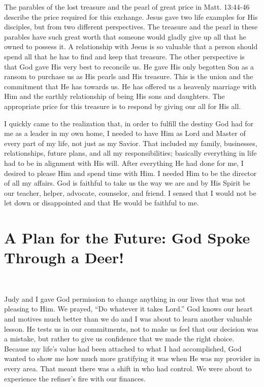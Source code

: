 \documentclass[twoside, 12pt]{book}
\begin{document}
The parables of the lost treasure and the pearl of great price in Matt. 13:44-46 describe the price required for this exchange. Jesus gave two life examples for His disciples, but from two different perspectives. The treasure and the pearl in these parables have such great worth that someone would gladly give up all that he owned to possess it. A relationship with Jesus is so valuable that a person should spend all that he has to find and keep that treasure. The other perspective is that God gave His very best to reconcile us. He gave His only begotten Son as a ransom to purchase us as His pearls and His treasure. This is the union and the commitment that He has towards us. He has offered us a heavenly marriage with Him and the earthly relationship of being His sons and daughters. The appropriate price for this treasure is to respond by giving our all for His all.

I quickly came to the realization that, in order to fulfill the destiny God had for me as a leader in my own home, I needed to have Him as Lord and Master of every part of my life, not just as my Savior. That included my family, businesses, relationships, future plans, and all my responsibilities; basically everything in life had to be in alignment with His will. After everything He had done for me, I desired to please Him and spend time with Him. I needed Him to be the director of all my affairs. God is faithful to take us the way we are and by His Spirit be our teacher, helper, advocate, counselor, and friend. I sensed that I would not be let down or disappointed and that He would be faithful to me.


\chapter{A Plan for the Future: God Spoke Through a Deer!}
\

Judy and I gave God permission to change anything in our lives that was not pleasing to Him. We prayed, “Do whatever it takes Lord.” God knows our heart and motives much better than we do and I was about to learn another valuable lesson. He tests us in our commitments, not to make us feel that our decision was a mistake, but rather to give us confidence that we made the right choice. Because my life’s value had been attached to what I had accomplished, God wanted to show me how much more gratifying it was when He was my provider in every area. That meant there was a shift in who had control. We were about to experience the refiner's fire with our finances.
\end{document}

